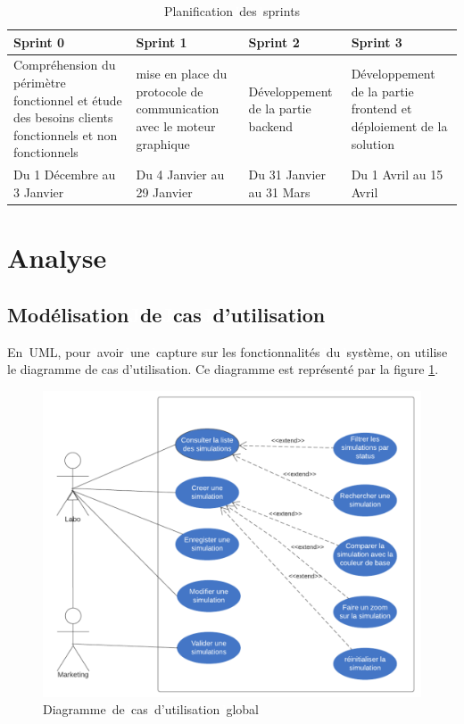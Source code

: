 \begin{table}[h!]
\center
\begin{tabular}[b]{|m{3cm}|m{3cm}|m{3cm}|m{3cm}|}
\hline
\rowcolor{white}
Sprint 0 & Sprint 1 & Sprint 2 & Sprint 3 \\
\hline
Compréhension du périmètre fonctionnel et étude des besoins clients fonctionnels et non fonctionnels & mise en place du protocole de communication avec le moteur graphique & Développement de la partie backend & Développement de la partie frontend et déploiement de la solution \\
\hline
Du 1 Décembre au 3 Janvier  & Du 4 Janvier au 29 Janvier & Du 31 Janvier au 31 Mars & Du 1 Avril au 15 Avril \\
\hline
\end{tabular}
\caption{Planification\textcolor{white}{J}des\textcolor{white}{J}sprints}
\label{tab:tab-s}
\end{table}

\newpage
\section{Analyse}
\subsection{Modélisation\textcolor{white}{J}de\textcolor{white}{J}cas\textcolor{white}{J}d'utilisation}
En\textcolor{white}{J}UML, pour\textcolor{white}{J}avoir\textcolor{white}{J}une\textcolor{white}{J}capture sur les fonctionnalités\textcolor{white}{J}du\textcolor{white}{J}système, on utilise le diagramme de cas d’utilisation. Ce diagramme est représenté par la figure \ref{fig:usecaseGlob}.


\begin{figure}[!ht]
\centering
\includegraphics[width=1\textwidth,angle=00]{chapitres/chapitre2/figures/diagUseCaseGen.png}
\caption{Diagramme\textcolor{white}{J}de\textcolor{white}{J}cas\textcolor{white}{J}d'utilisation\textcolor{white}{J}global}
\label{fig:usecaseGlob}
\end{figure}

